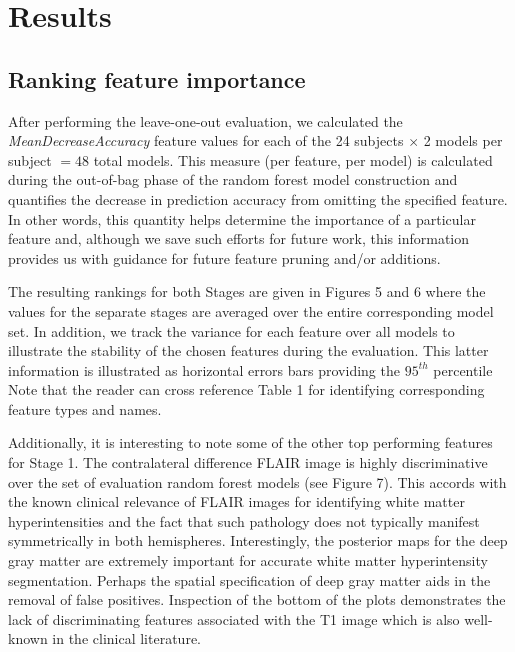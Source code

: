\documentclass[11pt,]{article}
\begin{document}
\section{Results}\label{results}

\subsection{Ranking feature
importance}\label{ranking-feature-importance}

After performing the leave-one-out evaluation, we calculated the
\emph{MeanDecreaseAccuracy} feature values for each of the 24 subjects
\(\times\) 2 models per subject \(=48\) total models. This measure (per
feature, per model) is calculated during the out-of-bag phase of the
random forest model construction and quantifies the decrease in
prediction accuracy from omitting the specified feature. In other words,
this quantity helps determine the importance of a particular feature
and, although we save such efforts for future work, this information
provides us with guidance for future feature pruning and/or additions.

The resulting rankings for both Stages are given in Figures 5 and 6
where the values for the separate stages are averaged over the entire
corresponding model set. In addition, we track the variance for each
feature over all models to illustrate the stability of the chosen
features during the evaluation. This latter information is illustrated
as horizontal errors bars providing the \(95^{th}\) percentile Note that
the reader can cross reference Table 1 for identifying corresponding
feature types and names.

Additionally, it is interesting to note some of the other top performing
features for Stage 1. The contralateral difference FLAIR image is highly
discriminative over the set of evaluation random forest models (see
Figure 7). This accords with the known clinical relevance of FLAIR
images for identifying white matter hyperintensities and the fact that
such pathology does not typically manifest symmetrically in both
hemispheres. Interestingly, the posterior maps for the deep gray matter
are extremely important for accurate white matter hyperintensity
segmentation. Perhaps the spatial specification of deep gray matter aids
in the removal of false positives. Inspection of the bottom of the plots
demonstrates the lack of discriminating features associated with the T1
image which is also well-known in the clinical literature.
\end{document}
